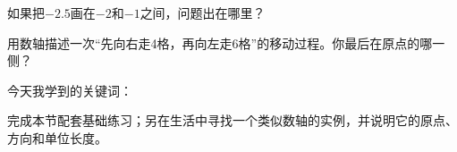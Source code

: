 \documentclass[UTF8,a4paper,11pt]{ctexart}
\begin{document}
如果把\(-2.5\)画在\(-2\)和\(-1\)之间，问题出在哪里？

用数轴描述一次“先向右走4格，再向左走6格”的移动过程。你最后在原点的哪一侧？

今天我学到的关键词：\makebox[0.72\linewidth]{\dotfill}


完成本节配套基础练习；另在生活中寻找一个类似数轴的实例，并说明它的原点、方向和单位长度。
\end{document}
